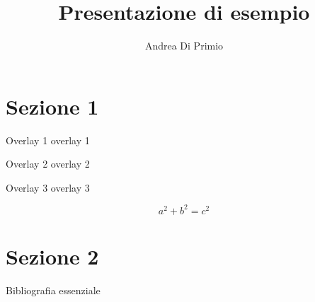 \documentclass[11pt]{beamer}
\author{Andrea Di Primio}
\title{Presentazione di esempio}
\begin{document}
	\begin{frame}
		\maketitle
	\end{frame}
		
	\begin{frame}
		\tableofcontents
	\end{frame}

	\section{Sezione 1}
	\begin{frame}
		\onslide<1->
		\begin{block}{Overlay 1}
			overlay 1
		\end{block}
		\onslide<2->
		\begin{block}{Overlay 2}
			overlay 2
		\end{block}
		\onslide<4>
		\begin{block}{Overlay 3}
			overlay 3
		\end{block}
		\onslide<3->
		\begin{equation*}
			a^2 + b^2 = c^2
		\end{equation*}
	\end{frame}
	\section{Sezione 2}
	
	\begin{frame}[allowframebreaks]{Bibliografia essenziale}
		\nocite{*}
		\printbibliography
	\end{frame}
\end{document}

